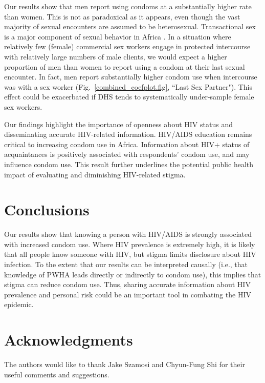 \documentclass[10pt,letterpaper]{article}
\newcommand{\fref}[1]{Fig.~\ref{#1.fig}}
\begin{document}
Our results show that men report using condoms at a substantially higher rate than women.  This is not as paradoxical as it appears, even though the vast majority of sexual encounters are assumed to be heterosexual. Transactional sex is a major component of sexual behavior in Africa \cite{BassMhlo91}. In a situation where relatively few (female) commercial sex workers engage in protected intercourse with relatively large numbers of male clients, we would expect a higher proportion of men than women to report using a condom at their last sexual encounter. In fact, men report substantially higher condom use when intercourse was with a sex worker (\fref{combined_coefplot}, ``Last Sex Partner"). This effect could be exacerbated if DHS tends to systematically under-sample female sex workers. 

Our findings highlight the importance of openness about HIV status and disseminating accurate HIV-related information.  HIV/AIDS education remains critical to increasing condom use in Africa.  Information about HIV+ status of acquaintances is positively associated with respondents' condom use, and may influence condom use.  This result further underlines the potential public health impact of evaluating and diminishing HIV-related stigma. 

\section{Conclusions}

Our results show that knowing a person with HIV/AIDS is strongly associated with increased condom use.  Where HIV prevalence is extremely high, it is likely that all people know someone with HIV, but stigma limits disclosure about HIV infection.  To the extent that our results can be interpreted causally (i.e., that knowledge of PWHA leads directly or indirectly to condom use), this implies that stigma can reduce condom use. Thus, sharing accurate information about HIV prevalence and personal risk could be an important tool in  combating the HIV epidemic.




\section*{Acknowledgments}
The authors would like to thank Jake Szamosi and Chyun-Fung Shi for their useful comments and suggestions. 


\nolinenumbers

%
%
% 


\end{document}
